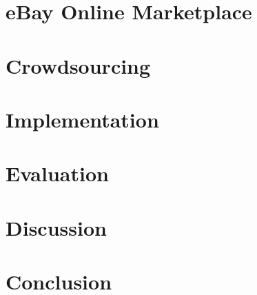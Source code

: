 \documentclass[a4paper]{report}
\begin{document}
\chapter{eBay Online Marketplace}
\label{chap:ebay}


\chapter{Crowdsourcing}
\label{chap:crowdsourcing}


\chapter{Implementation}
\label{chap:implementation}


\chapter{Evaluation}
\label{chap:evaluation}


\chapter{Discussion}
\label{chap:discussion}


\chapter{Conclusion}
\label{chap:conclusion}


\clearpage



\newpage
\begin{appendices}

\end{appendices}
\end{document}

